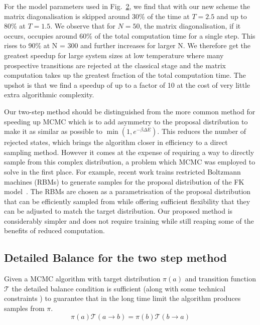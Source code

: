 For the model parameters used in Fig.~\protect\hyperlink{fig:indiv_IPR}{2}, we find that with our new scheme the matrix diagonalisation is skipped around 30\% of the time at \(T = 2.5\) and up to 80\% at \(T = 1.5\). We observe that for \(N = 50\), the matrix diagonalisation, if it occurs, occupies around 60\% of the total computation time for a single step. This rises to 90\% at N = 300 and further increases for larger N. We therefore get the greatest speedup for large system sizes at low temperature where many prospective transitions are rejected at the classical stage and the matrix computation takes up the greatest fraction of the total computation time. The upshot is that we find a speedup of up to a factor of 10 at the cost of very little extra algorithmic complexity.

Our two-step method should be distinguished from the more common method for speeding up MCMC which is to add asymmetry to the proposal distribution to make it as similar as possible to \(\min\left(1, e^{-\beta \Delta E}\right)\). This reduces the number of rejected states, which brings the algorithm closer in efficiency to a direct sampling method. However it comes at the expense of requiring a way to directly sample from this complex distribution, a problem which MCMC was employed to solve in the first place. For example, recent work trains restricted Boltzmann machines (RBMs) to generate samples for the proposal distribution of the FK model~\autocite{huangAcceleratedMonteCarlo2017}. The RBMs are chosen as a parametrisation of the proposal distribution that can be efficiently sampled from while offering sufficient flexibility that they can be adjusted to match the target distribution. Our proposed method is considerably simpler and does not require training while still reaping some of the benefits of reduced computation.

\hypertarget{detailed-balance-for-the-two-step-method}{%
\subsection{Detailed Balance for the two step method}\label{detailed-balance-for-the-two-step-method}}

Given a MCMC algorithm with target distribution \(\pi(a)\) and transition function \(\mathcal{T}\) the detailed balance condition is sufficient (along with some technical constraints \autocite{wolffMonteCarloErrors2004}) to guarantee that in the long time limit the algorithm produces samples from \(\pi\). \[\pi(a)\mathcal{T}(a \to b) = \pi(b)\mathcal{T}(b \to a)\]

